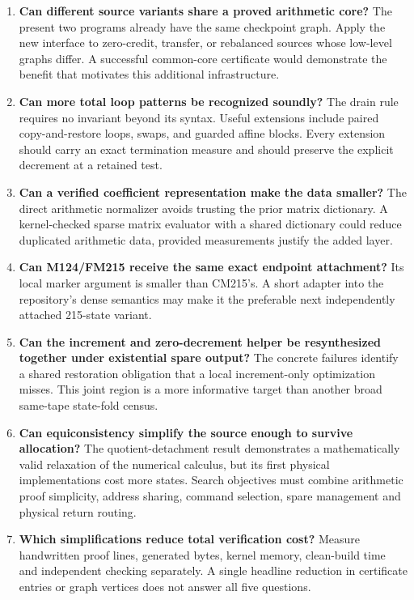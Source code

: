 \documentclass[11pt,letterpaper]{article}
\theoremstyle{definition}\newtheorem{definition}[theorem]{Definition}
\begin{document}
\begin{enumerate}
\item \textbf{Can different source variants share a proved arithmetic core?}
The present two programs already have the same checkpoint graph. Apply the
new interface to zero-credit, transfer, or rebalanced sources whose low-level
graphs differ. A successful common-core certificate would demonstrate the
benefit that motivates this additional infrastructure.
\item \textbf{Can more total loop patterns be recognized soundly?}
The drain rule requires no invariant beyond its syntax. Useful extensions
include paired copy-and-restore loops, swaps, and guarded affine blocks.
Every extension should carry an exact termination measure and should preserve
the explicit decrement at a retained test.
\item \textbf{Can a verified coefficient representation make the data smaller?}
The direct arithmetic normalizer avoids trusting the prior matrix dictionary.
A kernel-checked sparse matrix evaluator with a shared dictionary could reduce
duplicated arithmetic data, provided measurements justify the added layer.
\item \textbf{Can M124/FM215 receive the same exact endpoint attachment?}
Its local marker argument is smaller than CM215's. A short adapter into the
repository's dense semantics may make it the preferable next independently
attached 215-state variant.
\item \textbf{Can the increment and zero-decrement helper be resynthesized
together under existential spare output?}
The concrete failures identify a shared restoration obligation that a local
increment-only optimization misses. This joint region is a more informative
target than another broad same-tape state-fold census.
\item \textbf{Can equiconsistency simplify the source enough to survive
allocation?}
The quotient-detachment result demonstrates a mathematically valid relaxation
of the numerical calculus, but its first physical implementations cost more
states. Search objectives must combine arithmetic proof simplicity, address
sharing, command selection, spare management and physical return routing.
\item \textbf{Which simplifications reduce total verification cost?}
Measure handwritten proof lines, generated bytes, kernel memory, clean-build
time and independent checking separately. A single headline reduction in
certificate entries or graph vertices does not answer all five questions.
\end{enumerate}
\end{document}
